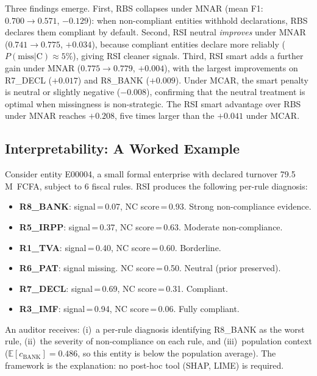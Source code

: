 \documentclass[letterpaper]{article}
\begin{document}
Three findings emerge. First, RBS collapses under MNAR (mean
F1: $0.700 \to 0.571$, $-0.129$): when non-compliant entities
withhold declarations, RBS declares them compliant by default.
Second, RSI neutral \emph{improves} under MNAR ($0.741 \to 0.775$,
$+0.034$), because compliant entities declare more reliably
($P(\text{miss}|\text{C}) \approx 5\%$), giving RSI cleaner signals.
Third, RSI smart adds a further gain under MNAR ($0.775 \to 0.779$,
$+0.004$), with the largest improvements on R7\_DECL ($+0.017$) and
R8\_BANK ($+0.009$). Under MCAR, the smart penalty is neutral or
slightly negative ($-0.008$), confirming that the neutral treatment
is optimal when missingness is non-strategic. The RSI smart advantage
over RBS under MNAR reaches $+0.208$, five times larger than the
$+0.041$ under MCAR.

\subsection{Interpretability: A Worked Example}

Consider entity E00004, a small formal enterprise with declared
turnover 79.5\,M~FCFA, subject to 6 fiscal rules. RSI produces the
following per-rule diagnosis:

\begin{itemize}[leftmargin=2em]
  \item \textbf{R8\_BANK}: signal\,=\,0.07, NC score\,=\,0.93.
        \hfill Strong non-compliance evidence.
  \item \textbf{R5\_IRPP}: signal\,=\,0.37, NC score\,=\,0.63.
        \hfill Moderate non-compliance.
  \item \textbf{R1\_TVA}: signal\,=\,0.40, NC score\,=\,0.60.
        \hfill Borderline.
  \item \textbf{R6\_PAT}: signal missing. NC score\,=\,0.50.
        \hfill Neutral (prior preserved).
  \item \textbf{R7\_DECL}: signal\,=\,0.69, NC score\,=\,0.31.
        \hfill Compliant.
  \item \textbf{R3\_IMF}: signal\,=\,0.94, NC score\,=\,0.06.
        \hfill Fully compliant.
\end{itemize}

An auditor receives: (i)~a per-rule diagnosis identifying R8\_BANK as
the worst rule, (ii)~the severity of non-compliance on each rule, and
(iii)~population context ($\mathbb{E}[c_{\mathrm{BANK}}]=0.486$, so
this entity is below the population average). The framework is the
explanation: no post-hoc tool (SHAP, LIME) is required.
\end{document}
